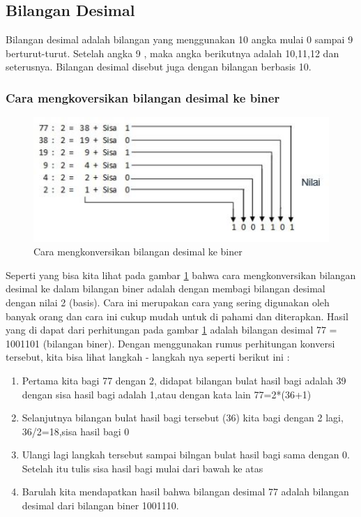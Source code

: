 \subsection{Bilangan Desimal}
Bilangan desimal adalah bilangan yang menggunakan 10 angka mulai 0 sampai 9 berturut-turut. Setelah angka 9 , maka angka berikutnya adalah 10,11,12 dan seterusnya. Bilangan desimal disebut juga dengan bilangan berbasis 10.
\subsubsection{Cara mengkoversikan bilangan desimal ke biner}
\begin{figure}[ht]
\centerline{\includegraphics[width=1\textwidth]{figures/konversibiner.JPG}}
\caption{Cara mengkonversikan bilangan desimal ke biner}
\label{konversibiner}
\end{figure}
Seperti yang bisa kita lihat pada gambar \ref{konversibiner} bahwa cara mengkonversikan bilangan desimal ke dalam bilangan biner adalah dengan membagi bilangan desimal dengan nilai 2 (basis). Cara ini merupakan cara yang sering digunakan oleh banyak orang dan cara ini cukup mudah untuk di pahami dan diterapkan. Hasil yang di dapat dari perhitungan pada gambar \ref{konversibiner} adalah bilangan desimal 77 = 1001101 (bilangan biner). Dengan menggunakan rumus perhitungan konversi tersebut, kita bisa lihat langkah - langkah nya seperti berikut ini : 
\begin{enumerate}
\item Pertama kita bagi 77 dengan 2, didapat bilangan bulat hasil bagi adalah 39 dengan sisa hasil bagi adalah 1,atau dengan kata lain 77=2*(36+1)
\item Selanjutnya bilangan bulat hasil bagi tersebut (36) kita bagi dengan 2 lagi, 36/2=18,sisa hasil bagi 0
\item Ulangi lagi langkah tersebut sampai bilngan bulat hasil bagi sama dengan 0. Setelah itu tulis sisa hasil bagi mulai dari bawah ke atas
\item Barulah kita mendapatkan hasil bahwa bilangan desimal 77 adalah bilangan desimal dari bilangan biner 1001110.
\end{enumerate}

